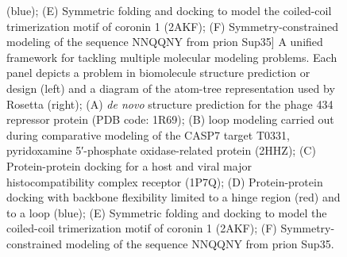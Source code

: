 \begin{refsection}
\begin{figure}[p]
        (blue); (E) Symmetric folding and docking to model the coiled-coil
        trimerization motif of coronin 1 (2AKF); (F) Symmetry-constrained
        modeling of the sequence NNQQNY from prion Sup35] {A unified framework
            for tackling multiple molecular modeling problems. Each panel
            depicts a problem in biomolecule structure prediction or design
            (left) and a diagram of the atom-tree representation used by
            Rosetta (right); (A) \emph{de novo} structure prediction for the
            phage 434 repressor protein (PDB code: 1R69); (B) loop modeling
            carried out during comparative modeling of the CASP7 target T0331,
            pyridoxamine 5′-phosphate oxidase-related protein (2HHZ); (C)
            Protein-protein docking for a host and viral major
            histocompatibility complex receptor (1P7Q); (D) Protein-protein
            docking with backbone flexibility limited to a hinge region (red)
            and to a loop (blue); (E) Symmetric folding and docking to model
            the coiled-coil trimerization motif of coronin 1 (2AKF); (F)
            Symmetry-constrained modeling of the sequence NNQQNY from prion
            Sup35\cite{Das2008}.} 
        \label{fig:rosetta-overview} 
\end{figure}


\end{refsection}

